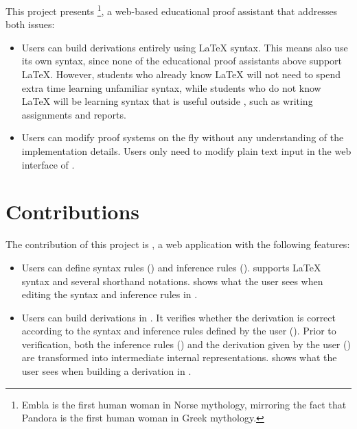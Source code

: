 This project presents \projectname{}\footnote{Embla is the first human woman in Norse mythology, mirroring the fact that Pandora is the first human woman in Greek mythology.}, a web-based educational proof assistant that addresses both issues:
\begin{itemize}
    \item Users can build derivations entirely using \LaTeX{} syntax. This means \projectname{} also use its own syntax, since none of the educational proof assistants above support \LaTeX{}. However, students who already know \LaTeX{} will not need to spend extra time learning unfamiliar syntax, while students who do not know \LaTeX{} will be learning syntax that is useful outside \projectname{}, such as writing assignments and reports.
    \item Users can modify proof systems on the fly without any understanding of the implementation details. Users only need to modify plain text input in the web interface of \projectname{}.
\end{itemize}

\section{Contributions}
The contribution of this project is \projectname{}, a web application with the following features:
\begin{itemize}
    \item Users can define syntax rules () and inference rules (). \projectname{} supports \LaTeX{} syntax and several shorthand notations.  shows what the user sees when editing the syntax and inference rules in \projectname{}.
    \item Users can build derivations in \projectname{}. It verifies whether the derivation is correct according to the syntax and inference rules defined by the user (). Prior to verification, both the inference rules () and the derivation given by the user () are transformed into intermediate internal representations.  shows what the user sees when building a derivation in \projectname{}.
\end{itemize}

